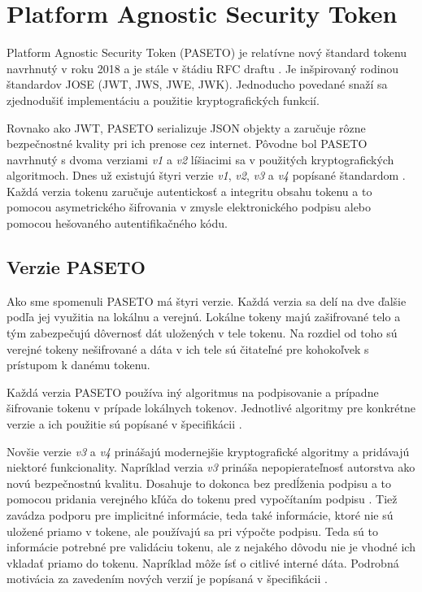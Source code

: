 \section{Platform Agnostic Security Token}

Platform Agnostic Security Token (PASETO) je relatívne nový štandard tokenu navrhnutý v roku 2018 a je stále v štádiu RFC draftu \cite{paseto_rfc}. Je inšpirovaný rodinou štandardov JOSE (JWT, JWS, JWE, JWK). Jednoducho povedané snaží sa zjednodušiť implementáciu a použitie kryptografických funkcií.

Rovnako ako JWT, PASETO serializuje JSON objekty a zaručuje rôzne bezpečnostné kvality pri ich prenose cez internet. Pôvodne bol PASETO navrhnutý s dvoma verziami \textit{v1} a \textit{v2} líšiacimi sa v použitých kryptografických algoritmoch. Dnes už existujú štyri verzie \textit{v1}, \textit{v2}, \textit{v3} a \textit{v4} popísané štandardom \cite{paseto_git}. Každá verzia tokenu zaručuje autentickosť a integritu obsahu tokenu a to pomocou asymetrického šifrovania v zmysle elektronického podpisu alebo pomocou hešovaného autentifikačného kódu.

\subsection{Verzie PASETO}

Ako sme spomenuli PASETO má štyri verzie. Každá verzia sa delí na dve ďalšie podľa jej využitia na lokálnu a verejnú. Lokálne tokeny majú zašifrované telo a tým zabezpečujú dôvernosť dát uložených v tele tokenu. Na rozdiel od toho sú verejné tokeny nešifrované a dáta v ich tele sú čitateľné pre kohokoľvek s prístupom k danému tokenu.

Každá verzia PASETO používa iný algoritmus na podpisovanie a prípadne šifrovanie tokenu v prípade lokálnych tokenov. Jednotlivé algoritmy pre konkrétne verzie a ich použitie sú popísané v špecifikácii \cite{paseto_git}.

Novšie verzie \textit{v3} a \textit{v4} prinášajú modernejšie kryptografické algoritmy a pridávajú niektoré funkcionality. Napríklad verzia \textit{v3} prináša nepopierateľnosť autorstva ako novú bezpečnostnú kvalitu. Dosahuje to dokonca bez predĺženia podpisu a to pomocou pridania verejného kľúča do tokenu pred vypočítaním podpisu \cite{ueo}. Tiež zavádza podporu pre implicitné informácie, teda také informácie, ktoré nie sú uložené priamo v tokene, ale používajú sa pri výpočte podpisu. Teda sú to informácie potrebné pre validáciu tokenu, ale z nejakého dôvodu nie je vhodné ich vkladať priamo do tokenu. Napríklad môže ísť o citlivé interné dáta. Podrobná motivácia za zavedením nových verzií je popísaná v špecifikácii \cite{paseto_git}.

